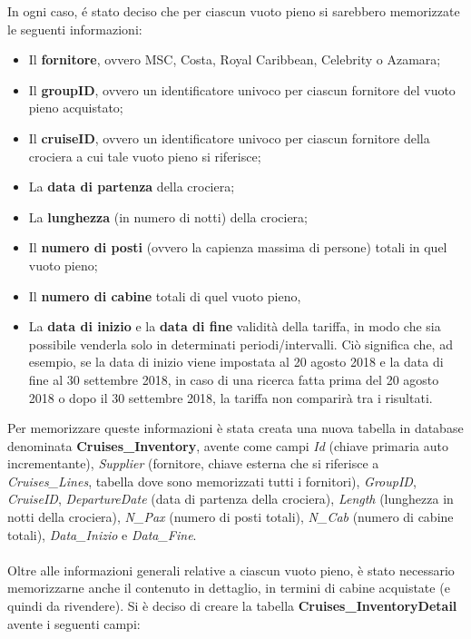 In ogni caso, é stato deciso che per ciascun vuoto pieno si sarebbero memorizzate le seguenti informazioni:
\begin{itemize}
	\item Il \textbf{fornitore}, ovvero MSC, Costa, Royal Caribbean, Celebrity o Azamara;
	\item Il \textbf{groupID}, ovvero un identificatore univoco per ciascun fornitore del vuoto pieno acquistato;
	\item Il \textbf{cruiseID}, ovvero un identificatore univoco per ciascun fornitore della crociera a cui tale vuoto pieno si riferisce;
	\item La \textbf{data di partenza} della crociera;
	\item La \textbf{lunghezza} (in numero di notti) della crociera;
	\item Il \textbf{numero di posti} (ovvero la capienza massima di persone) totali in quel vuoto pieno;
	\item Il \textbf{numero di cabine} totali di quel vuoto pieno,
	\item La \textbf{data di inizio} e la \textbf{data di fine} validità della tariffa, in modo che sia possibile venderla solo in determinati periodi/intervalli. Ciò significa che, ad esempio, se la data di inizio viene impostata al 20 agosto 2018 e la data di fine al 30 settembre 2018, in caso di una ricerca fatta prima del 20 agosto 2018 o dopo il 30 settembre 2018, la tariffa non comparirà tra i risultati.
\end{itemize}
Per memorizzare queste informazioni è stata creata una nuova tabella in database denominata \textbf{Cruises\_Inventory}, avente come campi \textit{Id} (chiave primaria auto incrementante), \textit{Supplier} (fornitore, chiave esterna che si riferisce a \textit{Cruises\_Lines}, tabella dove sono memorizzati tutti i fornitori), \textit{GroupID}, \textit{CruiseID}, \textit{DepartureDate} (data di partenza della crociera), \textit{Length} (lunghezza in notti della crociera), \textit{N\_Pax} (numero di posti totali), \textit{N\_Cab} (numero di cabine totali), \textit{Data\_Inizio} e \textit{Data\_Fine}.\\
\\
Oltre alle informazioni generali relative a ciascun vuoto pieno, è stato necessario memorizzarne anche il contenuto in dettaglio, in termini di cabine acquistate (e quindi da rivendere). Si è deciso di creare la tabella \textbf{Cruises\_InventoryDetail} avente i seguenti campi:
